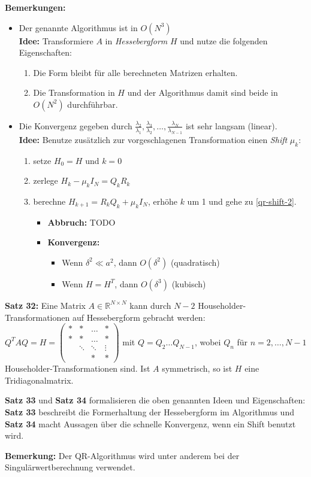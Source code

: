 \documentclass[a4paper]{article}
\begin{document}
\textbf{Bemerkungen:}
\begin{itemize}
    \item Der genannte Algorithmus ist in $O(N^3)$
    \\\textbf{Idee:} Transformiere $A$ in \emph{Hessebergform} $H$ und nutze die
    folgenden Eigenschaften:
    \begin{enumerate}
        \item Die Form bleibt für alle berechneten Matrizen erhalten.
        \item Die Transformation in $H$ und der Algorithmus damit sind beide in
        $O(N^2)$ durchführbar.
    \end{enumerate}
    \item Die Konvergenz gegeben durch $\frac{\lambda_2}{\lambda_1},
    \frac{\lambda_3}{\lambda_2}, \dots, \frac{\lambda_N}{\lambda_{N - 1}}$ ist
    sehr langsam (linear).
    \\\textbf{Idee:} Benutze zusätzlich zur vorgeschlagenen Transformation einen
    \emph{Shift} $\mu_k$:
    \begin{enumerate}
        \item setze $H_0 = H$ und $k = 0$
        \item\label{qr-shift-2} zerlege $H_k - \mu_k I_N = Q_k R_k$
        \item berechne $H_{k + 1} = R_k Q_k + \mu_k I_N$, erhöhe $k$ um 1 und
        gehe zu \ref{qr-shift-2}.
        \begin{itemize}
            \item \textbf{Abbruch:} TODO
            \item \textbf{Konvergenz:}
            \begin{itemize}
                \item Wenn $\delta^2 \ll a^2$, dann $O(\delta^2)$ (quadratisch)
                \item Wenn $H = H^T$, dann $O(\delta^3)$ (kubisch) 
            \end{itemize}
        \end{itemize}
    \end{enumerate}
\end{itemize}

\textbf{Satz 32:} Eine Matrix $A \in \mathbb{R}^{N \times N}$ kann durch $N - 2$
Householder-Transformationen auf Hessebergform gebracht werden:
$Q^T A Q = H =
\begin{pmatrix}
    * & * & \dots & *\\
    * & * & \dots & *\\
      & \ddots & \ddots & \vdots\\
      &   & *     & *
\end{pmatrix}
$
mit $Q = Q_2 \dots Q_{N - 1}$, wobei $Q_n$ für $n = 2, \dots, N - 1$
Householder-Transformationen sind. Ist $A$ symmetrisch, so ist $H$ eine
Tridiagonalmatrix.

\textbf{Satz 33} und \textbf{Satz 34} formalisieren die oben genannten Ideen und
Eigenschaften: \textbf{Satz 33} beschreibt die Formerhaltung der Hessebergform
im Algorithmus und \textbf{Satz 34} macht Aussagen über die schnelle Konvergenz,
wenn ein Shift benutzt wird.

\textbf{Bemerkung:} Der QR-Algorithmus wird unter anderem bei der
Singulärwertberechnung verwendet.
\end{document}

